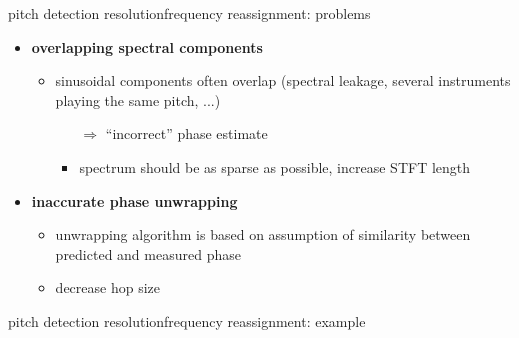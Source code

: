         \begin{frame}{pitch detection resolution}{frequency reassignment: problems}
                \begin{itemize}
                    \item   \textbf{overlapping spectral components}
                        \begin{itemize}
                            \item   sinusoidal components often overlap (spectral leakage, several instruments playing the same pitch, ...)
                                \begin{itemize}
                                    \item[$\Rightarrow$] ``incorrect'' phase estimate
                                    \item<1-> spectrum should be as sparse as possible, increase STFT length
                                \end{itemize}
                        \end{itemize}
                    \bigskip
                    \item<2->   \textbf{inaccurate phase unwrapping} 
                        \begin{itemize}
                            \item   unwrapping algorithm is based on assumption of similarity between predicted and measured phase
                            \item<2-> decrease hop size
                        \end{itemize}
                \end{itemize}
        \end{frame}
        \begin{frame}{pitch detection resolution}{frequency reassignment: example}
        \end{frame}
            
